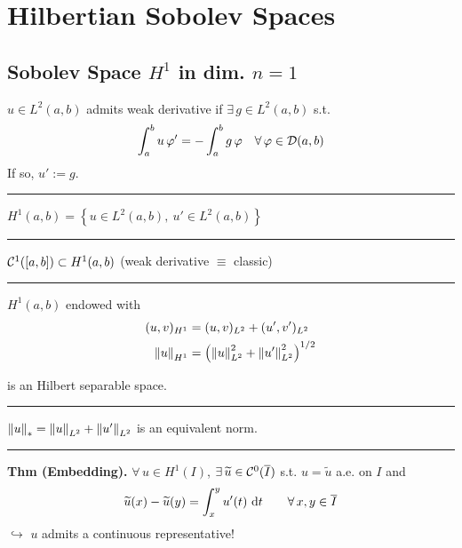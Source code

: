 

\section{\color{forestgreen(web)}Hilbertian Sobolev Spaces }



\subsection{\color{red}Sobolev Space \texorpdfstring{$H^1$}{C} in dim. \texorpdfstring{$n=1$}{C}}


$u\in L^2(a,b)$ admits weak derivative if $\exists\,g\in L^2(a,b)$ s.t.
\begin{equation*}
\int_a^b u\,\varphi'=-\int_a^b g\,\varphi\quad\forall\, \varphi\in \mathcal{D}(a,b)
\end{equation*}
If so, $u':=g$.

\rule{0.31\textwidth}{0.2pt}
\smallskip

$H^1(a,b) = \left\{ u\in L^2(a,b),\ u'\in L^2(a,b) \right\}$

\rule{0.31\textwidth}{0.2pt}
\smallskip

$\mathcal{C}^1([a,b])\subset H^1(a,b)$ (weak derivative $\equiv$ classic)

\rule{0.31\textwidth}{0.2pt}
\smallskip

$H^1(a,b)$ endowed with
\begin{align*}
(u,v)_{H^1}&=(u,v)_{L^2}+(u',v')_{L^2} \\
\left\lVert u \right\rVert_{H^1}&=\left( \left\lVert u \right\rVert^2_{L^2}+\left\lVert u' \right\rVert^2_{L^2} \right)^{1/2}
\end{align*}

is an Hilbert separable space.

\rule{0.31\textwidth}{0.2pt}
\smallskip

$\left\lVert u \right\rVert_{*}=\left\lVert u \right\rVert_{L^2}+\left\lVert u' \right\rVert
_{L^2}$ is an equivalent norm.

\rule{0.31\textwidth}{0.2pt}
\smallskip

\textbf{Thm (Embedding).} $\forall\,u\in H^1(I)$, $\exists\,\widetilde{u}\in\mathcal{C}^0(\overline{I})$ s.t. $u=\widetilde{u}$ a.e. on $I$ and 
\begin{equation*}
\widetilde{u}(x)-\widetilde{u}(y)=\int_x^y u'(t)\  \mathrm{d} t\qquad\forall\, x,y\in \overline{I}
\end{equation*}
$\hookrightarrow$ $u$ admits a continuous representative!

